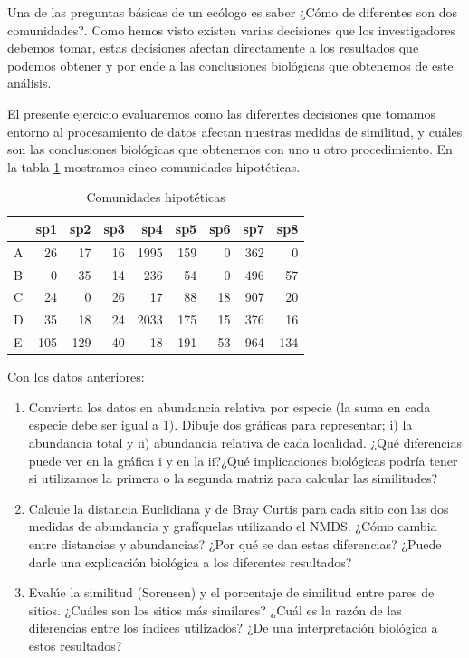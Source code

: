 \documentclass[]{book}
\begin{document}
Una de las preguntas básicas de un ecólogo es saber ¿Cómo de diferentes
son dos comunidades?. Como hemos visto existen varias decisiones que los
investigadores debemos tomar, estas decisiones afectan directamente a
los resultados que podemos obtener y por ende a las conclusiones
biológicas que obtenemos de este análisis.

El presente ejercicio evaluaremos como las diferentes decisiones que
tomamos entorno al procesamiento de datos afectan nuestras medidas de
similitud, y cuáles son las conclusiones biológicas que obtenemos con
uno u otro procedimiento. En la tabla \ref{tab:ejer1} mostramos cinco
comunidades hipotéticas.

\begin{table}

\caption{\label{tab:ejer1}Comunidades hipotéticas}
\centering
\begin{tabular}[t]{lrrrrrrrr}
\toprule
  & sp1 & sp2 & sp3 & sp4 & sp5 & sp6 & sp7 & sp8\\
\midrule
A & 26 & 17 & 16 & 1995 & 159 & 0 & 362 & 0\\
B & 0 & 35 & 14 & 236 & 54 & 0 & 496 & 57\\
C & 24 & 0 & 26 & 17 & 88 & 18 & 907 & 20\\
D & 35 & 18 & 24 & 2033 & 175 & 15 & 376 & 16\\
E & 105 & 129 & 40 & 18 & 191 & 53 & 964 & 134\\
\bottomrule
\end{tabular}
\end{table}

Con los datos anteriores:

\begin{enumerate}
\def\labelenumi{\alph{enumi}.}
\item
  Convierta los datos en abundancia relativa por especie (la suma en
  cada especie debe ser igual a 1). Dibuje dos gráficas para
  representar; i) la abundancia total y ii) abundancia relativa de cada
  localidad. ¿Qué diferencias puede ver en la gráfica i y en la ii?¿Qué
  implicaciones biológicas podría tener si utilizamos la primera o la
  segunda matriz para calcular las similitudes?
\item
  Calcule la distancia Euclidiana y de Bray Curtis para cada sitio con
  las dos medidas de abundancia y grafíquelas utilizando el NMDS. ¿Cómo
  cambia entre distancias y abundancias? ¿Por qué se dan estas
  diferencias? ¿Puede darle una explicación biológica a los diferentes
  resultados?
\item
  Evalúe la similitud (Sorensen) y el porcentaje de similitud entre
  pares de sitios. ¿Cuáles son los sitios más similares? ¿Cuál es la
  razón de las diferencias entre los índices utilizados? ¿De una
  interpretación biológica a estos resultados?
\end{enumerate}


\end{document}
